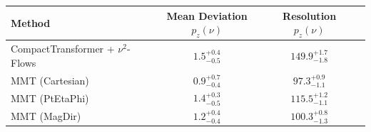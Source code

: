     \begin{tabular}{lccc}
        \toprule
        Method & Mean Deviation $p_{z}(\nu)$ & Resolution $p_{z}(\nu)$ \\
        \midrule
        CompactTransformer + $\nu^2$-Flows & $1.5^{+0.4}_{-0.5}$ & $149.9^{+1.7}_{-1.8}$ \\
        MMT (Cartesian) & $0.9^{+0.7}_{-0.4}$ & $97.3^{+0.9}_{-1.1}$ \\
        MMT (PtEtaPhi) & $1.4^{+0.3}_{-0.5}$ & $115.5^{+1.2}_{-1.1}$ \\
        MMT (MagDir) & $1.2^{+0.4}_{-0.4}$ & $100.3^{+0.8}_{-1.3}$ \\
        \bottomrule
    \end{tabular}